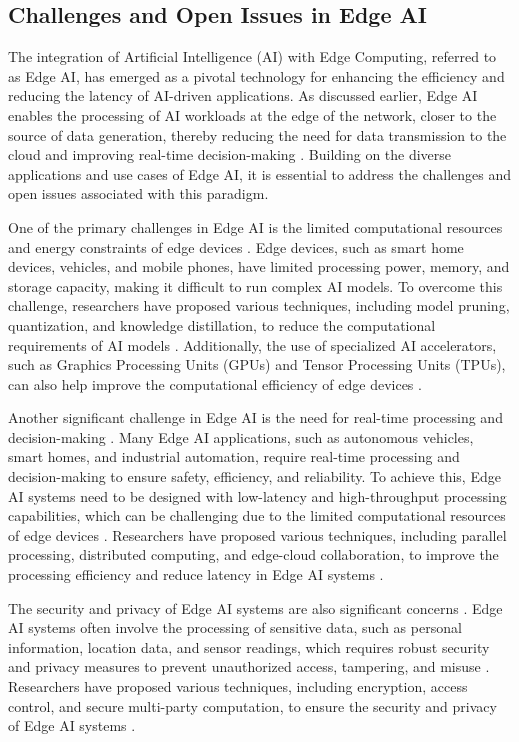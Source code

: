 \documentclass[11pt,a4paper]{article}
\begin{document}
\subsection{Challenges and Open Issues in Edge AI}


The integration of Artificial Intelligence (AI) with Edge Computing, referred to as Edge AI, has emerged as a pivotal technology for enhancing the efficiency and reducing the latency of AI-driven applications. As discussed earlier, Edge AI enables the processing of AI workloads at the edge of the network, closer to the source of data generation, thereby reducing the need for data transmission to the cloud and improving real-time decision-making \cite{arxiv:1906.11056}. Building on the diverse applications and use cases of Edge AI, it is essential to address the challenges and open issues associated with this paradigm.

One of the primary challenges in Edge AI is the limited computational resources and energy constraints of edge devices \cite{arxiv:2210.03204}. Edge devices, such as smart home devices, vehicles, and mobile phones, have limited processing power, memory, and storage capacity, making it difficult to run complex AI models. To overcome this challenge, researchers have proposed various techniques, including model pruning, quantization, and knowledge distillation, to reduce the computational requirements of AI models \cite{arxiv:2111.10076}. Additionally, the use of specialized AI accelerators, such as Graphics Processing Units (GPUs) and Tensor Processing Units (TPUs), can also help improve the computational efficiency of edge devices \cite{arxiv:2402.13056}.

Another significant challenge in Edge AI is the need for real-time processing and decision-making \cite{arxiv:1812.01344}. Many Edge AI applications, such as autonomous vehicles, smart homes, and industrial automation, require real-time processing and decision-making to ensure safety, efficiency, and reliability. To achieve this, Edge AI systems need to be designed with low-latency and high-throughput processing capabilities, which can be challenging due to the limited computational resources of edge devices \cite{arxiv:2108.00591}. Researchers have proposed various techniques, including parallel processing, distributed computing, and edge-cloud collaboration, to improve the processing efficiency and reduce latency in Edge AI systems \cite{arxiv:2005.07301}.

The security and privacy of Edge AI systems are also significant concerns \cite{arxiv:2206.07164}. Edge AI systems often involve the processing of sensitive data, such as personal information, location data, and sensor readings, which requires robust security and privacy measures to prevent unauthorized access, tampering, and misuse \cite{arxiv:1704.06749}. Researchers have proposed various techniques, including encryption, access control, and secure multi-party computation, to ensure the security and privacy of Edge AI systems \cite{arxiv:2211.05851}.
\end{document}
